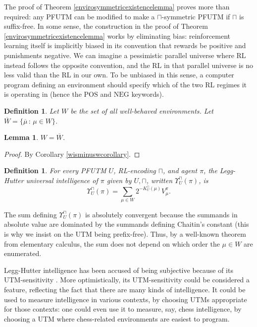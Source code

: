 \documentclass{article}
\newtheorem{definition}[theorem]{Definition}
\newtheorem{lemma}[theorem]{Lemma}
\def\LH{\Upsilon}
\begin{document}
The proof of Theorem \ref{envirosymmetricexistencelemma} proves more than required:
any PFUTM can be modified to make a $\sqcap$-symmetric PFUTM
if $\sqcap$ is suffix-free. In some sense,
the construction in the proof of Theorem \ref{envirosymmetricexistencelemma} works
by eliminating bias: reinforcement learning itself is implicitly biased in its
convention that rewards be positive and punishments negative. We can imagine
a pessimistic parallel universe
where RL instead follows the opposite convention, and the
RL in that parallel universe is no less valid than the RL in our own. To be
unbiased in this sense, a computer program defining an environment
should specify which of the two RL regimes it is operating in (hence the
$\mathrm{POS}$ and $\mathrm{NEG}$ keywords).

\begin{definition}
    Let $W$ be the set of all well-behaved environments.
    Let $\overline W=\{\overline\mu\,:\,\mu\in W\}$.
\end{definition}

\begin{lemma}
\label{WequalsminusWlemma}
$W=\overline W$.
\end{lemma}

\begin{proof}
    By Corollary \ref{wisminuswcorollary}.
\end{proof}

\begin{definition}
\label{universalintelligencedefn}
For every PFUTM $U$, RL-encoding $\sqcap$, and agent $\pi$,
the \emph{Legg-Hutter universal intelligence of $\pi$ given
by $U,\sqcap$}, written $\LH^\sqcap_U(\pi)$, is
\[
    \LH^\sqcap_U(\pi) = \sum_{\mu \in W} 2^{-K^\sqcap_U(\mu)}V^\pi_\mu.
\]
\end{definition}

The sum defining $\LH^\sqcap_U(\pi)$ is absolutely convergent because the summands
in absolute value are dominated by the summands defining Chaitin's constant
(this is why we insist on the UTM being prefix-free).
Thus, by a well-known
theorem from elementary calculus, the sum does not depend on which order the $\mu\in W$
are enumerated.

Legg-Hutter intelligence has been accused of being subjective
because of its UTM-sensitivity \cite{leike2015bad}. More optimistically,
its UTM-sensitivity could be considered a feature, reflecting the fact
that there are many kinds of intelligence. It could be used to measure
intelligence in various contexts, by choosing UTMs appropriate for those
contexts: one could even use it to measure, say, chess intelligence,
by choosing a UTM where chess-related environments are easiest to program.
\end{document}
